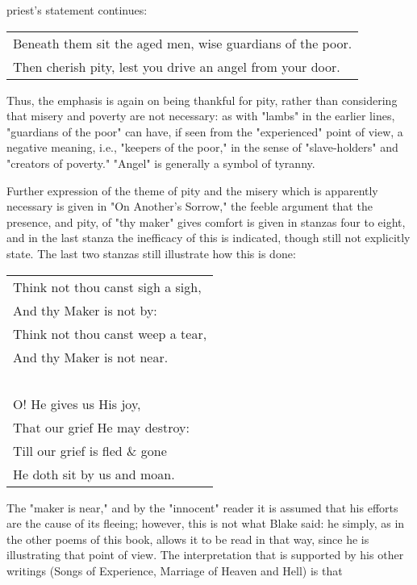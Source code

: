 \noindent priest's statement continues:\par
\begin{center}
	\begin{tabular}{l}
		Beneath them sit the aged men, wise guardians of the poor. \\
		Then cherish pity, lest you drive an angel from your door.
	\end{tabular}
\end{center}
\hspace*{5mm}Thus, the emphasis is again on being thankful for pity, rather than considering that misery and poverty are not
necessary: as with "lambs" in the earlier lines, "guardians of the poor" can have,
if seen from the "experienced" point of view, a negative meaning, i.e., "keepers of the poor,"
in the sense of "slave-holders" and "creators of poverty." "Angel" is generally a symbol of tyranny.\par
\vspace*{0.5\baselineskip}
Further expression of the theme of pity and the misery which is apparently necessary is given in "On Another's Sorrow," the
feeble argument that the presence, and pity, of "thy maker" gives comfort is given in stanzas four to eight, and in
the last stanza the inefficacy of this is indicated, though still not explicitly state. The last two stanzas still illustrate how this is done:\par
\begin{center}
	\begin{tabular}{l}
		Think not thou canst sigh a sigh, \\
		And thy Maker is not by:          \\
		Think not thou canst weep a tear, \\
		And thy Maker is not near.        \\
		~                                 \\
		O! He gives us His joy,           \\
		That our grief He may destroy:    \\
		Till our grief is fled \& gone    \\
		He doth sit by us and moan.
	\end{tabular}
\end{center}
The "maker is near," and by the "innocent" reader it is assumed that his efforts are the cause of its fleeing; however, this
is not what Blake said: he simply, as in the other poems of this book, allows it to be read in that way, since he is illustrating
that point of view. The interpretation that is supported by his other writings (Songs of Experience, Marriage of Heaven and Hell) is that
